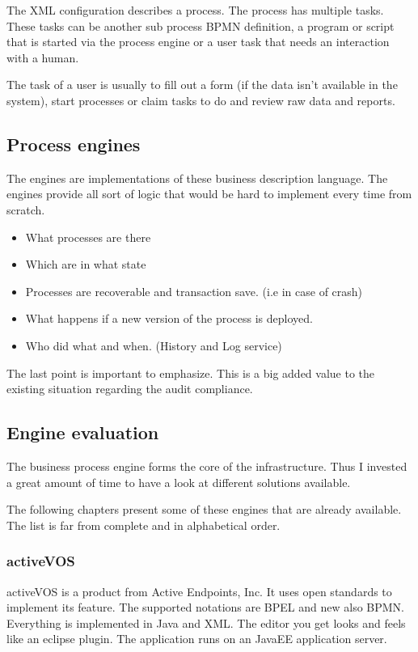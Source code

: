 \documentclass[paper=a4,twoside=false,BCOR=0mm,DIV=calc,fontsize=12pt]{scrartcl}
\begin{document}
The XML configuration describes a process. The process has multiple tasks. These tasks can be another sub process BPMN definition, a program or script that is started via the process engine or a user task that needs an interaction with a human. 

The task of a user is usually to fill out a form (if the data isn't available in the system), start processes or claim tasks to do and review raw data and reports.

\subsection{Process engines}
The engines are implementations of these business description language. The engines provide all sort of logic that would be hard to implement every time from scratch.
\begin{itemize}
  \item What processes are there
  \item Which are in what state
  \item Processes are recoverable and transaction save. (i.e in case of crash)
  \item What happens if a new version of the process is deployed.
  \item Who did what and when. (History and Log service)
\end{itemize}

The last point is important to emphasize. This is a big added value to the existing situation regarding the audit compliance.

\subsection{Engine evaluation}
The business process engine forms the core of the infrastructure. Thus I invested a great amount of time to have a look at different solutions available.

The following chapters present some of these engines that are already available. The list is far from complete and in alphabetical order.

\subsubsection{activeVOS}
activeVOS \cite{activevos} is a product from Active Endpoints, Inc. It uses open standards to implement its feature. The supported notations are BPEL and new also BPMN. Everything is implemented in Java and XML. The editor you get looks and feels like an eclipse plugin. The application runs on an JavaEE application server.
\end{document}
